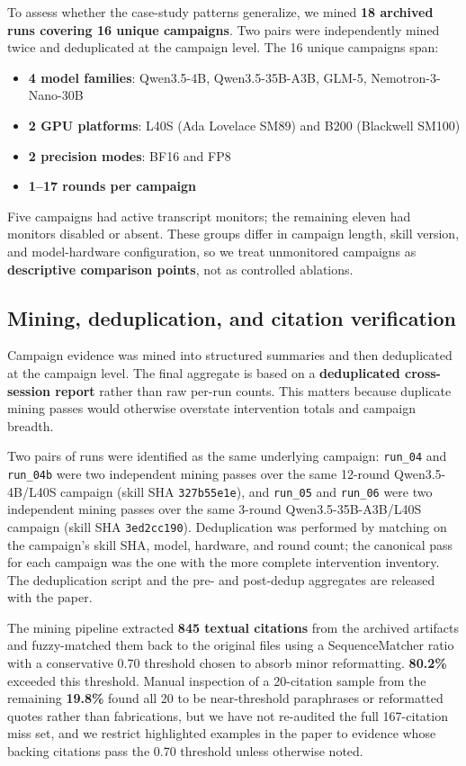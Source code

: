 \documentclass[11pt]{article}
\begin{document}
To assess whether the case-study patterns generalize, we mined \textbf{18 archived runs covering 16 unique campaigns}. Two pairs were independently mined twice and deduplicated at the campaign level. The 16 unique campaigns span:

\begin{itemize}[leftmargin=*,itemsep=2pt]
  \item \textbf{4 model families}: Qwen3.5-4B, Qwen3.5-35B-A3B, GLM-5, Nemotron-3-Nano-30B
  \item \textbf{2 GPU platforms}: L40S (Ada Lovelace SM89) and B200 (Blackwell SM100)
  \item \textbf{2 precision modes}: BF16 and FP8
  \item \textbf{1--17 rounds per campaign}
\end{itemize}

Five campaigns had active transcript monitors; the remaining eleven had monitors disabled or absent. These groups differ in campaign length, skill version, and model-hardware configuration, so we treat unmonitored campaigns as \textbf{descriptive comparison points}, not as controlled ablations.

\subsection{Mining, deduplication, and citation verification}

Campaign evidence was mined into structured summaries and then deduplicated at the campaign level. The final aggregate is based on a \textbf{deduplicated cross-session report} rather than raw per-run counts. This matters because duplicate mining passes would otherwise overstate intervention totals and campaign breadth.

Two pairs of runs were identified as the same underlying campaign: \texttt{run\_04} and \texttt{run\_04b} were two independent mining passes over the same 12-round Qwen3.5-4B/L40S campaign (skill SHA \texttt{327b55e1e}), and \texttt{run\_05} and \texttt{run\_06} were two independent mining passes over the same 3-round Qwen3.5-35B-A3B/L40S campaign (skill SHA \texttt{3ed2cc190}). Deduplication was performed by matching on the campaign's skill SHA, model, hardware, and round count; the canonical pass for each campaign was the one with the more complete intervention inventory. The deduplication script and the pre- and post-dedup aggregates are released with the paper.

The mining pipeline extracted \textbf{845 textual citations} from the archived artifacts and fuzzy-matched them back to the original files using a SequenceMatcher ratio with a conservative 0.70 threshold chosen to absorb minor reformatting. \textbf{80.2\%} exceeded this threshold. Manual inspection of a 20-citation sample from the remaining \textbf{19.8\%} found all 20 to be near-threshold paraphrases or reformatted quotes rather than fabrications, but we have not re-audited the full 167-citation miss set, and we restrict highlighted examples in the paper to evidence whose backing citations pass the 0.70 threshold unless otherwise noted.
\end{document}
